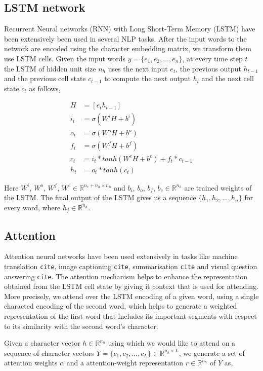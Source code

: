 \documentclass[11pt,letterpaper]{article}
\begin{document}
\subsection{LSTM network}

Recurrent Neural networks (RNN) with Long Short-Term Memory (LSTM) have been extensively been used in several NLP tasks. After the input words to the network are encoded using the character embedding matrix, we transform them use LSTM cells. Given the input words $y = \{e_1, e_2, ..., e_n\}$, at every time step $t$ the LSTM of hidden unit size $n_h$ uses the next input $e_t$, the previous output $h_{t-1}$ and the previous cell state $c_{t-1}$ to compute the next output $h_t$ and the next cell state $c_t$ as follows,

\begin{align}
H &= [e_t h_{t-1}] \\
i_t &= \sigma (W^iH + b^i) \\
o_t &= \sigma (W^oH + b^o) \\
f_t &= \sigma (W^fH + b^f) \\
c_t &= i_t * tanh(W^cH + b^c) + f_t * c_{t-1} \\
h_t &= o_t * tanh(c_t)
\end{align}

Here $W^i$, $W^o$, $W^f$, $W^c \in  \mathbb{R}^{n_e+n_h \times n_h}$ and $b_i$, $b_o$, $b_f$, $b_c \in \mathbb{R}^{n_h}$ are trained weights of the LSTM. The final output of the LSTM gives us a sequence $\{h_1, h_2, ..., h_n\}$ for every word, where $h_j \in \mathbb{R}^{n_h}$.

\subsection{Attention}

Attention neural networks have been used extensively in tasks like machine translation \texttt{cite}, image captioning \texttt{cite}, summarisation \texttt{cite} and visual question answering \texttt{cite}. The attention mechanism helps to enhance the representation obtained from the LSTM cell state by giving it context that is used for attending. More precisely, we attend over the LSTM encoding of a given word, using a single characted encoding of the second word, which helps to generate a weighted representation of the first word that includes its important segments with respect to its similarity with the second word's character. 

Given a character vector $h \in  \mathbb{R}^{n_h}$ using which we would like to attend on a sequence of character vectors $Y = \{c_1, c_2, ..., c_L\} \in \mathbb{R}^{n_h \times L}$, we generate a set of attention weights $\alpha$ and a attention-weight representation $r \in  \mathbb{R}^{n_h}$ of $Y$ as,
\end{document}
